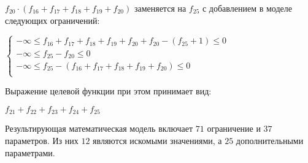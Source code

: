 \begin{enumerate}
  $f_{20} \cdot (f_{16} + f_{17} + f_{18} + f_{19} + f_{20})$ заменяется на $f_{25}$ с добавлением в моделе следующих ограничений:
  \begin{center}
    $
      \begin{cases}
        -\infty \le f_{16} + f_{17} + f_{18} + f_{19} + f_{20} + f_{20} - (f_{25} + 1) \le 0 \\ %
        -\infty \le f_{25} - f_{20} \le 0 \\ %
        -\infty \le f_{25} - (f_{16} + f_{17} + f_{18} + f_{19} + f_{20}) \le 0 \\ %
      \end{cases}
    $
  \end{center}

  Выражение целевой функции при этом принимает вид:
  \begin{center}
    $f_{21} + f_{22} + f_{23} + f_{24} + f_{25}$
  \end{center}
\end{enumerate}

Результирующая математическая модель включает $71$ ограничение и $37$ параметров. Из них $12$ являются искомыми значениями, а $25$ дополнительными параметрами.